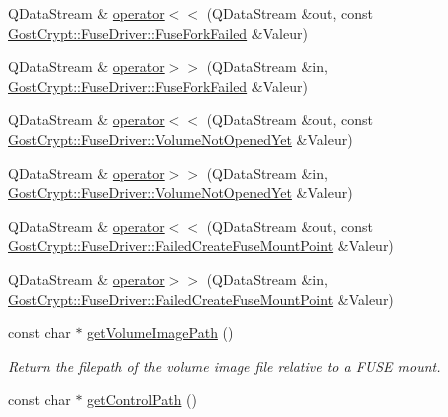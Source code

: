 \begin{DoxyCompactItemize}
\item 
Q\+Data\+Stream \& \hyperlink{namespace_gost_crypt_1_1_fuse_driver_a4ccdc0758c3f1a31fc9f7c5ee8d12fbe}{operator$<$$<$} (Q\+Data\+Stream \&out, const \hyperlink{class_gost_crypt_1_1_fuse_driver_1_1_fuse_fork_failed}{Gost\+Crypt\+::\+Fuse\+Driver\+::\+Fuse\+Fork\+Failed} \&Valeur)
\item 
Q\+Data\+Stream \& \hyperlink{namespace_gost_crypt_1_1_fuse_driver_a12257ab43940149308ca56d261ad5bd1}{operator$>$$>$} (Q\+Data\+Stream \&in, \hyperlink{class_gost_crypt_1_1_fuse_driver_1_1_fuse_fork_failed}{Gost\+Crypt\+::\+Fuse\+Driver\+::\+Fuse\+Fork\+Failed} \&Valeur)
\item 
Q\+Data\+Stream \& \hyperlink{namespace_gost_crypt_1_1_fuse_driver_ac7e34e8caa7244810c4a0f3605df29ec}{operator$<$$<$} (Q\+Data\+Stream \&out, const \hyperlink{class_gost_crypt_1_1_fuse_driver_1_1_volume_not_opened_yet}{Gost\+Crypt\+::\+Fuse\+Driver\+::\+Volume\+Not\+Opened\+Yet} \&Valeur)
\item 
Q\+Data\+Stream \& \hyperlink{namespace_gost_crypt_1_1_fuse_driver_a80bdf11c0f9e7a75c7644128e42d93ec}{operator$>$$>$} (Q\+Data\+Stream \&in, \hyperlink{class_gost_crypt_1_1_fuse_driver_1_1_volume_not_opened_yet}{Gost\+Crypt\+::\+Fuse\+Driver\+::\+Volume\+Not\+Opened\+Yet} \&Valeur)
\item 
Q\+Data\+Stream \& \hyperlink{namespace_gost_crypt_1_1_fuse_driver_aab7325e2ce94279830b293a769040b40}{operator$<$$<$} (Q\+Data\+Stream \&out, const \hyperlink{class_gost_crypt_1_1_fuse_driver_1_1_failed_create_fuse_mount_point}{Gost\+Crypt\+::\+Fuse\+Driver\+::\+Failed\+Create\+Fuse\+Mount\+Point} \&Valeur)
\item 
Q\+Data\+Stream \& \hyperlink{namespace_gost_crypt_1_1_fuse_driver_a119cbf6e7bc642ab3bd90e3d4678237e}{operator$>$$>$} (Q\+Data\+Stream \&in, \hyperlink{class_gost_crypt_1_1_fuse_driver_1_1_failed_create_fuse_mount_point}{Gost\+Crypt\+::\+Fuse\+Driver\+::\+Failed\+Create\+Fuse\+Mount\+Point} \&Valeur)
\item 
const char $\ast$ \hyperlink{namespace_gost_crypt_1_1_fuse_driver_aea46c93ec99374bd8baf2d07ac6b492d}{get\+Volume\+Image\+Path} ()
\begin{DoxyCompactList}\small\item\em Return the filepath of the volume image file relative to a F\+U\+SE mount. \end{DoxyCompactList}\item 
const char $\ast$ \hyperlink{namespace_gost_crypt_1_1_fuse_driver_aea46579083a08cf177ef77110d5e6d2f}{get\+Control\+Path} ()

\end{DoxyCompactItemize}
